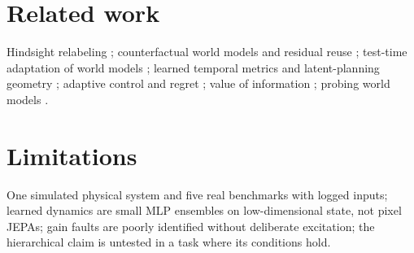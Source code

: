 \documentclass[11pt]{article}
\begin{document}
\section{Related work}
Hindsight relabeling \citep{andrychowicz2017her}; counterfactual world models and residual reuse \citep{cwm_2611_24778};
test-time adaptation of world models \citep{adajepa_2606_32026,t2z_2610_22364,jepattt_2610_00722}; learned temporal
metrics and latent-planning geometry \citep{howlong_2610_04988,latentproj_2610_26979,transition_geometry_2611_30064};
adaptive control and regret \citep{laiwei1982,abbasi2011,simchowitz2020,cassel2020,astrom_wittenmark}; value of
information \citep{blackwell1953}; probing world models \citep{li2023othello,probing_rl_wm_2603_21546}.

\section{Limitations}
One simulated physical system and five real benchmarks with logged inputs; learned dynamics are small MLP ensembles on
low-dimensional state, not pixel JEPAs; gain faults are poorly identified without deliberate excitation; the
hierarchical claim is untested in a task where its conditions hold.



\end{document}
